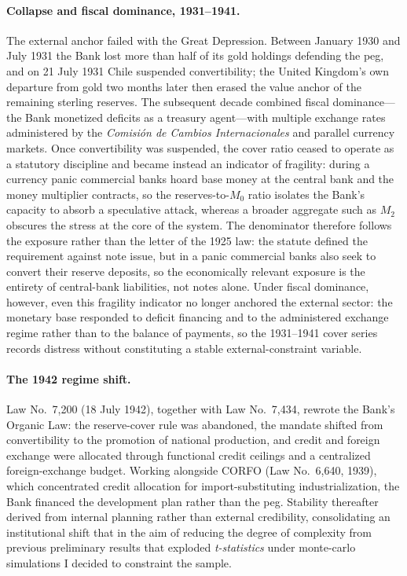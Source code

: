 \paragraph{Collapse and fiscal dominance, 1931--1941.}
The external anchor failed with the Great Depression. Between
January 1930 and July 1931 the Bank lost more than half of its
gold holdings defending the peg, and on 21 July 1931 Chile
suspended convertibility; the United Kingdom's own departure from
gold two months later then erased the value anchor of the
remaining sterling reserves. The subsequent decade combined fiscal
dominance---the Bank monetized deficits as a treasury agent---with
multiple exchange rates administered by the \textit{Comisión de
	Cambios Internacionales} and parallel currency markets. Once
convertibility was suspended, the cover ratio ceased to operate
as a statutory discipline and became instead an indicator of
fragility: during a currency panic commercial banks hoard base
money at the central bank and the money multiplier contracts, so
the reserves-to-$M_0$ ratio isolates the Bank's capacity to absorb
a speculative attack, whereas a broader aggregate such as $M_2$
obscures the stress at the core of the system. The denominator
therefore follows the exposure rather than the letter of the 1925
law: the statute defined the requirement against note issue, but
in a panic commercial banks also seek to convert their reserve
deposits, so the economically relevant exposure is the entirety of
central-bank liabilities, not notes alone. Under fiscal dominance,
however, even this fragility indicator no longer anchored the
external sector: the monetary base responded to deficit financing
and to the administered exchange regime rather than to the balance
of payments, so the 1931--1941 cover series records distress
without constituting a stable external-constraint variable.


\paragraph{The 1942 regime shift.}
Law No.~7,200 (18 July 1942), together with Law No.~7,434, rewrote
the Bank's Organic Law: the reserve-cover rule was abandoned, the
mandate shifted from convertibility to the promotion of national
production, and credit and foreign exchange were allocated through
functional credit ceilings and a centralized foreign-exchange
budget. Working alongside CORFO (Law No.~6,640, 1939), which
concentrated credit allocation for import-substituting
industrialization, the Bank financed the development plan rather
than the peg. Stability thereafter derived from internal planning
rather than external credibility, consolidating an institutional shift 
that in the aim of reducing the degree of complexity from previous preliminary 
results that exploded \textit{t-statistics} under monte-carlo simulations I decided to constraint the sample. 


















